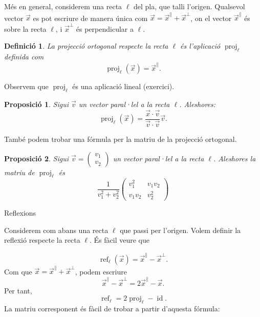 \documentclass[
  11pt,
]{book}
\makeatletter
\numberwithin{dummy}{section}
\theoremstyle{maincolornumbox}
\theoremstyle{blacknumex}
\theoremstyle{blacknumbox}
\newtheorem{definitionT}{Definició}[chapter]
\theoremstyle{maincolornum}
\newtheorem{propositionT}{Proposició}[chapter]
\newenvironment{proposition}{\begin{pBox}\begin{propositionT}}{\end{propositionT}\end{pBox}}
\newenvironment{definition}{\begin{dBox}\begin{definitionT}}{\end{definitionT}\end{dBox}}
\renewcommand{\subsection}{\@startsection {subsection}{2}{\z@}
{-3ex \@plus -0.1ex \@minus -.4ex}
{0.5ex \@plus.2ex }
{\normalfont\sffamily\bfseries}}
\newlength\esp
\makeatother
\begin{document}
Més en general, considerem una recta \(\ell\) del pla, que talli l'origen.
Qualsevol vector \(\vec x\) es pot escriure de manera única com
\(\vec x = \vec x^{\parallel} + \vec x^{\perp}\), on el vector
\(\vec x^\parallel\) és sobre la recta \(\ell\), i \(\vec x^\perp\) és
perpendicular a \(\ell\).

\begin{definition}
La \emph{projecció ortogonal} respecte la recta \(\ell\) és l'aplicació
\(\operatorname{proj}_\ell\) definida com
\[\operatorname{proj}_\ell(\vec x) = \vec x^\parallel.\]
\end{definition}

Observem que \(\operatorname{proj}_\ell\) és una aplicació lineal
(exercici).

\begin{proposition}
Sigui \(\vec v\) un vector paral·lel a la recta \(\ell\). Aleshores:
\[\operatorname{proj}_\ell(\vec x) = \frac{\vec x\cdot \vec v}{\vec v\cdot \vec v} \vec v.\]
\end{proposition}

També podem trobar una fórmula per la matriu de la projecció ortogonal.

\begin{proposition}
\protect\hypertarget{prp:projR2}{}\label{prp:projR2}Sigui
\(\vec v = \begin{pmatrix}v_1\\v_2\end{pmatrix}\) un vector paral·lel a la
recta \(\ell\). Aleshores la matriu de \(\operatorname{proj}_\ell\) és
\[\frac{1}{v_1^2 + v_2^2}\begin{pmatrix}v_1^2&v_1v_2\\v_1v_2&v_2^2\end{pmatrix}\]
\end{proposition}

\subsection{Reflexions}\label{subsubsec:reflexio}

Considerem com abans
una recta \(\ell\) que passi per l'origen. Volem definir la reflexió
respecte la recta \(\ell\). És fàcil veure que

\[\operatorname{ref}_\ell(\vec x) = \vec x^\parallel - \vec x^\perp.\]
Com que \(\vec x = \vec x^\parallel + \vec x^\perp\), podem escriure
\[\vec x^\parallel - \vec x^\perp = 2\vec x^\parallel - \vec x.\] Per
tant,
\[\operatorname{ref}_\ell = 2\operatorname{proj}_\ell - \operatorname{id}.\]
La matriu corresponent és fàcil de trobar a partir d'aquesta fórmula:
\end{document}
